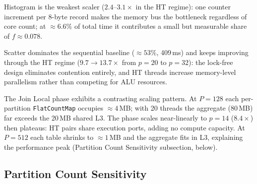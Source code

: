 \documentclass[10pt,a4paper,twocolumn]{article}
\begin{document}
Histogram is the weakest scaler ($2.4$--$3.1\times$ in the HT regime): one counter increment per 8-byte record makes the memory bus the bottleneck regardless of core count; at $\approx6.6\%$ of total time it contributes a small but measurable share of $f\approx0.078$.

Scatter dominates the sequential baseline ($\approx53\%$, 409\,ms) and keeps improving through the HT regime ($9.7\to 13.7\times$ from $p=20$ to $p=32$): the lock-free design eliminates contention entirely, and HT threads increase memory-level parallelism rather than competing for ALU resources.

The Join Local phase exhibits a contrasting scaling pattern. At $P=128$ each per-partition \texttt{FlatCountMap} occupies $\approx4$\,MB; with 20 threads the aggregate (80\,MB) far exceeds the 20\,MB shared L3. The phase scales near-linearly to $p=14$ ($8.4\times$) then plateaus: HT pairs share execution ports, adding no compute capacity. At $P=512$ each table shrinks to $\approx1$\,MB and the aggregate fits in L3, explaining the performance peak (Partition Count Sensitivity subsection, below).

\subsection*{Partition Count Sensitivity}
\label{sec:partition}
\end{document}

